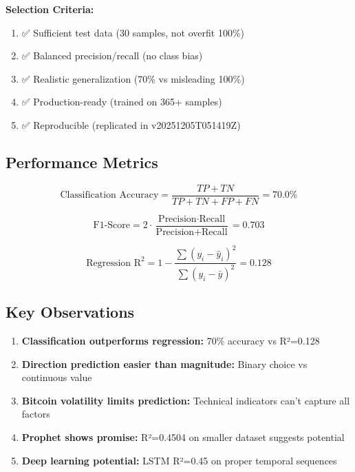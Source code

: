 \textbf{Selection Criteria:}
\begin{enumerate}
    \item ✅ Sufficient test data (30 samples, not overfit 100\%)
    \item ✅ Balanced precision/recall (no class bias)
    \item ✅ Realistic generalization (70\% vs misleading 100\%)
    \item ✅ Production-ready (trained on 365+ samples)
    \item ✅ Reproducible (replicated in v20251205T051419Z)
\end{enumerate}

\subsection{Performance Metrics}

\begin{equation}
\text{Classification Accuracy} = \frac{TP + TN}{TP + TN + FP + FN} = 70.0\%
\end{equation}

\begin{equation}
\text{F1-Score} = 2 \cdot \frac{\text{Precision} \cdot \text{Recall}}{\text{Precision} + \text{Recall}} = 0.703
\end{equation}

\begin{equation}
\text{Regression R}^2 = 1 - \frac{\sum(y_i - \hat{y}_i)^2}{\sum(y_i - \bar{y})^2} = 0.128
\end{equation}

\subsection{Key Observations}

\begin{enumerate}
    \item \textbf{Classification outperforms regression:} 70\% accuracy vs R²=0.128
    \item \textbf{Direction prediction easier than magnitude:} Binary choice vs continuous value
    \item \textbf{Bitcoin volatility limits prediction:} Technical indicators can't capture all factors
    \item \textbf{Prophet shows promise:} R²=0.4504 on smaller dataset suggests potential
    \item \textbf{Deep learning potential:} LSTM R²=0.45 on proper temporal sequences
\end{enumerate}

